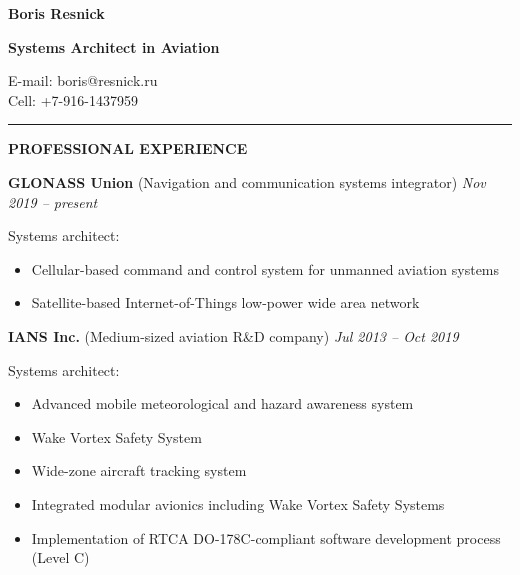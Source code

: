 \documentclass[a4paper]{article}
\begin{document}
    \thispagestyle{empty}
    
	\begin{center}
		{\Large \textbf{Boris Resnick}\par}
		\vspace{2mm}
		{\large \textbf{Systems Architect in A\hspace{-.4mm}viation}\par}
		\vspace{1mm}
		E-mail: boris@resnick.ru\\
		Cell: +7-916-1437959
	\end{center}
	\vspace{-2mm}
	\rule{\textwidth}{1pt}
	\vspace{2mm}

	\textbf{PROFESSIONAL EXPERIENCE}
	\vspace{4mm}

	\textbf{GLONASS Union} (Navigation and communication systems integrator) \hfill \textit{Nov 2019 -- present}
	\vspace{1mm}
	
    Systems architect:
	\begin{itemize}
	    \setlength{\itemindent}{.5cm}
	    \item Cellular-based command and control system for unmanned aviation systems
        \item Satellite-based Internet-of-Things low-power wide area network
    \end{itemize}
    \vspace{3mm}
    
    \textbf{IANS Inc.} (Medium-sized aviation R\&D company) \hfill \textit{ Jul 2013 -- Oct 2019}
    \vspace{1mm}
    
    Systems architect:
	\begin{itemize}
	    \setlength{\itemindent}{.5cm}
	    \item Advanced mobile meteorological and hazard awareness system
	    \item Wake Vortex Safety System
	    \item Wide-zone aircraft tracking system
	    \item Integrated modular avionics including Wake Vortex Safety Systems
	    \item Implementation of RTCA DO-178C-compliant software development process (Level C)
    \end{itemize}
    \vspace{3mm}
    
\end{document}
